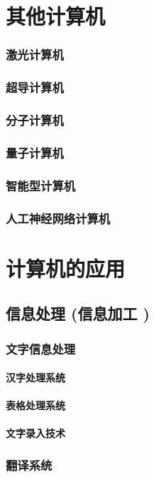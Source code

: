 \documentclass[UTF8]{../../ApplicationUniverse}
\begin{document}
\section{其他计算机}
    \subsubsection{激光计算机}
    \subsubsection{超导计算机}
    \subsubsection{分子计算机}
    \subsubsection{量子计算机}
    \subsubsection{智能型计算机}
    \subsubsection{人工神经网络计算机}

\section{计算机的应用}
    \subsection{信息处理 (信息加工 )}
        \subsubsection{文字信息处理}
            \paragraph{汉字处理系统}
            \paragraph{表格处理系统}
            \paragraph{文字录入技术}
        \subsubsection{翻译系统}
\end{document}
